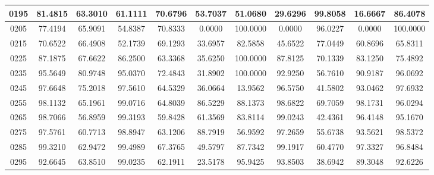 \begin{appendices}
\begin{table}
\begin{tabular}{ |c|c|c|c|c|c|c|c|c|c|c| }
0195 &  81.4815 &  63.3010 &   61.1111 &  70.6796 &   53.7037 &  51.0680 &   29.6296 &  99.8058 &   16.6667 &  86.4078    \\
\hline
0205 &  77.4194 &  65.9091 &   54.8387 &  70.8333 &   0.0000 &  100.0000 &   0.0000 &  96.0227 &   0.0000 &  100.0000    \\
\hline
0215 &  70.6522 &  66.4908 &   52.1739 &  69.1293 &   33.6957 &  82.5858 &   45.6522 &  77.0449 &   60.8696 &  65.8311    \\
\hline
0225 &  87.1875 &  67.6622 &   86.2500 &  63.3368 &   35.6250 &  100.0000 &   87.8125 &  70.1339 &   83.1250 &  75.4892    \\
\hline
0235 &  95.5649 &  80.9748 &   95.0370 &  72.4843 &   31.8902 &  100.0000 &   92.9250 &  56.7610 &   90.9187 &  96.0692    \\
\hline
0245 &  97.6648 &  75.2018 &   97.5610 &  64.5329 &   36.0664 &  13.9562 &   96.5750 &  41.5802 &   93.0462 &  97.6932    \\
\hline
0255 &  98.1132 &  65.1961 &   99.0716 &  64.8039 &   86.5229 &  88.1373 &   98.6822 &  69.7059 &   98.1731 &  96.0294    \\
\hline
0265 &  98.7066 &  56.8959 &   99.3193 &  59.8428 &   61.3569 &  83.8114 &   99.0243 &  42.4361 &   96.4148 &  95.1670    \\
\hline
0275 &  97.5761 &  60.7713 &   98.8947 &  63.1206 &   88.7919 &  56.9592 &   97.2659 &  55.6738 &   93.5621 &  98.5372    \\
\hline
0285 &  99.3210 &  62.9472 &   99.4989 &  67.3765 &   49.5797 &  87.7342 &   99.1917 &  60.4770 &   97.3327 &  96.8484    \\
\hline
0295 &  92.6645 &  63.8510 &   99.0235 &  62.1911 &   23.5178 &  95.9425 &   93.8503 &  38.6942 &   89.3048 &  92.6226    \\
\hline
\end{tabular}

\end{table}


\end{appendices}
